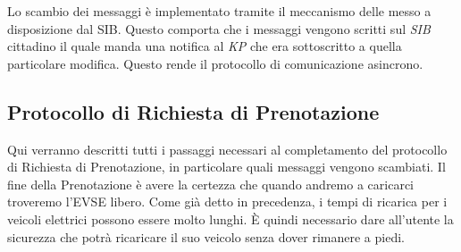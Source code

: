 Lo scambio dei messaggi è implementato tramite il meccanismo delle  messo a disposizione dal SIB. Questo comporta che i messaggi vengono scritti sul \emph{SIB} cittadino il quale manda una notifica al \emph{KP} che era sottoscritto a quella particolare modifica. Questo rende il protocollo di comunicazione asincrono.


\subsection{Protocollo di Richiesta di Prenotazione}

Qui verranno descritti tutti i passaggi necessari al completamento del protocollo di Richiesta di Prenotazione, in particolare quali messaggi vengono scambiati. Il fine della Prenotazione è avere la certezza che quando andremo a caricarci troveremo l'EVSE libero. Come già detto in precedenza, i tempi di ricarica per i veicoli elettrici possono essere molto lunghi. È quindi necessario dare all'utente la sicurezza che potrà ricaricare il suo veicolo senza dover rimanere a piedi.

